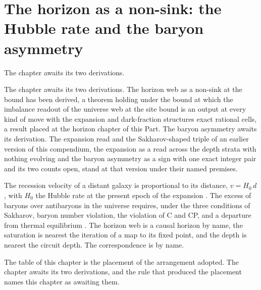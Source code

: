 \section{The horizon as a non-sink: the Hubble rate and the baryon asymmetry}\label{mod:X-8-horizon-as-a-non-sink-the-hubble-rate-and-the-baryon-asymmetry}
\begin{chtable}
The chapter awaits its two derivations.
\end{chtable}
\chdeps{}{}
The chapter awaits its two derivations. The horizon web as a non-sink at the bound has been derived, a theorem holding under the bound at which the imbalance readout of the universe web at the site bound is an output at every kind of move with the expansion and dark-fraction structures exact rational cells, a result placed at the horizon chapter of this Part. The baryon asymmetry awaits its derivation. The expansion read and the Sakharov-shaped triple of an earlier version of this compendium, the expansion as a read across the depth strata with nothing evolving and the baryon asymmetry as a sign with one exact integer pair and its two counts open, stand at that version under their named premises.
\begin{chbridge}
The recession velocity of a distant galaxy is proportional to its distance, $v = H_{0}\, d$, with $H_{0}$ the Hubble rate at the present epoch of the expansion \cite{Hubble1929}. The excess of baryons over antibaryons in the universe requires, under the three conditions of Sakharov, baryon number violation, the violation of C and CP, and a departure from thermal equilibrium \cite{Sakharov1967}. The horizon web is a causal horizon by name, the saturation is nearest the iteration of a map to its fixed point, and the depth is nearest the circuit depth. The correspondence is by name.
\end{chbridge}
\begin{chproof}
The table of this chapter is the placement of the arrangement adopted. The chapter awaits its two derivations, and the rule that produced the placement names this chapter as awaiting them.
\end{chproof}

